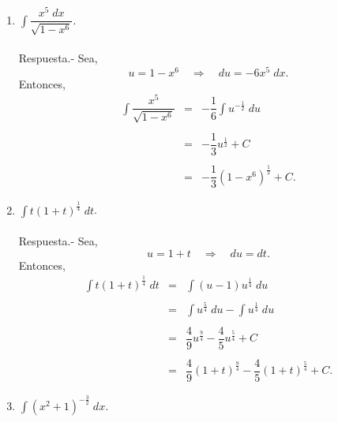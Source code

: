 \begin{enumerate}[\bfseries 1.]
    \item $\displaystyle\int  \dfrac{x^5\; dx}{\sqrt{1-x^6}}$.\\\\

	Respuesta.-\; Sea,
	$$u=1-x^6\quad \Rightarrow \quad du=-6x^5\; dx.$$
	Entonces,
	$$\begin{array}{rcl}
	    \displaystyle \int \dfrac{x^5}{\sqrt{1-x^6}}&=& -\dfrac{1}{6}\displaystyle\int u^{-\frac{1}{2}}\; du\\\\
						       &=&-\dfrac{1}{3}u^{\frac{1}{2}}+C\\\\
						       &=& -\dfrac{1}{3}\left(1-x^6\right)^{\frac{1}{2}} + C.
	\end{array}$$
	\vspace{.5cm}

    \item $\displaystyle\int t(1+t)^{\frac{1}{4}}\; dt$.\\\\

	Respuesta.-\; Sea,
	$$u=1+t\quad \Rightarrow \quad du=dt.$$
	Entonces,
	$$\begin{array}{rcl}
	    \displaystyle\int t(1+t)^{\frac{1}{4}}\; dt &=& \displaystyle\int (u-1)u^{\frac{1}{4}}\; du\\\\
							&=& \displaystyle\int u^{\frac{5}{4}}\; du - \int u^{\frac{1}{4}} \; du\\\\
							&=& \dfrac{4}{9}u^{\frac{9}{4}} - \dfrac{4}{5}u^{\frac{5}{4}} + C\\\\
							&=& \dfrac{4}{9}\left(1+t\right)^{\frac{9}{4}} - \dfrac{4}{5}\left(1+t\right)^{\frac{5}{4}} + C.
	\end{array}$$
	\vspace{.5cm}

    \item $\displaystyle\int (x^2+1)^{-\frac{3}{2}}\; dx$.\\\\


\end{enumerate}

